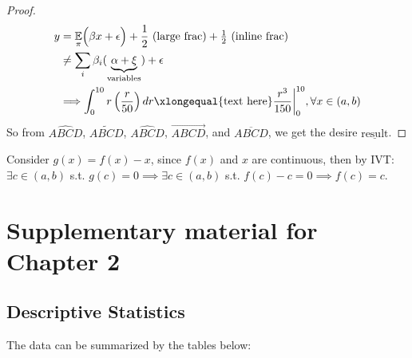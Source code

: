 \documentclass[letterpaper]{report}
\newcommand{\E}{\mathbb{E}}
\begin{document}
\begin{appendices}
\begin{proof}
    \vspace*{-1.2cm}
    
    \begin{align}\label{myEquation}
      \nonumber y&=\underset{\pi}{\E}\Big(\beta x + \epsilon\Big) + \dfrac{1}{2}\text{ (large frac)} + \tfrac{1}{2} \text{ (inline frac)}\\
      \nonumber &\neq\sum\limits_{i}\beta_i(\underbrace{\alpha+\xi}_{\text{variables}}) + \epsilon\\
      &\Longrightarrow \int_{0}^{10}r \left( \dfrac{r}{50} \right)dr\xlongequal{\text{text here}}\dfrac{r^{3}}{150}\biggr\rvert^{10}_{0}, \forall x\in (a,b)
    \end{align}
    So from $\widehat{ABCD}$, $\widetilde{ABCD}$, $\widehat{ABCD}$, $\overrightarrow{ABCD}$, and $\overline{ABCD}$, we get the desire $\underline{\text{result}}$.
  \end{proof}
  
  \begin{framed}
  Consider $g(x)=f(x)-x$, since $f(x)$ and $x$ are continuous, then by IVT: $\exists c\in(a,b)$ s.t. $g(c)=0\implies \exists c\in(a,b)$ s.t. $f(c)-c=0\implies f(c)=c.$
\end{framed}
  
  \chapter{Supplementary material for Chapter 2}
  
  \setcounter{table}{0}
  
  \section{Descriptive Statistics}
  
  The data can be summarized by the tables below:
  

\end{appendices}
\end{document}
